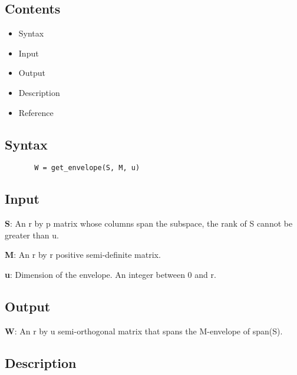 \documentclass[a4paper,11pt,openany]{memoir}
\begin{document}
\subsection*{Contents}

\begin{itemize}
\setlength{\itemsep}{-1ex}
   \item Syntax
   \item Input
   \item Output
   \item Description
   \item Reference
\end{itemize}


\subsection*{Syntax}


\begin{verbatim}       W = get_envelope(S, M, u)\end{verbatim}
    

\subsection*{Input}

\begin{par}
\textbf{S}: An r by p matrix whose columns span the subspace, the rank of S cannot be greater than u.
\end{par} \vspace{1em}
\begin{par}
\textbf{M}: An r by r positive semi-definite matrix.
\end{par} \vspace{1em}
\begin{par}
\textbf{u}: Dimension of the envelope. An integer between 0 and r.
\end{par} \vspace{1em}


\subsection*{Output}

\begin{par}
\textbf{W}: An r by u semi-orthogonal matrix that spans the M-envelope of span(S).
\end{par} \vspace{1em}


\subsection*{Description}
\end{document}

